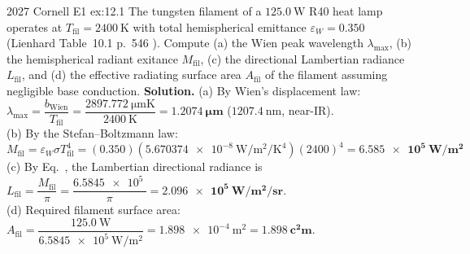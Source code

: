 \begin{workedexample}{2027 Cornell E1 }{ex:12.1}
The tungsten filament of a $\SI{125.0}{\watt}$ R40 heat lamp operates at $T_{\mathrm{fil}} = \SI{2400}{\kelvin}$ with total hemispherical emittance $\varepsilon_W = 0.350$ (Lienhard Table~10.1 p.~546 ). Compute (a) the Wien peak wavelength $\lambda_{\max}$, (b) the hemispherical radiant exitance $M_{\mathrm{fil}}$, (c) the directional Lambertian radiance $L_{\mathrm{fil}}$, and (d) the effective radiating surface area $A_{\mathrm{fil}}$ of the filament assuming negligible base conduction.
\tcblower
\textbf{Solution.} (a) By Wien's displacement law: $\lambda_{\max} = \dfrac{b_{\mathrm{Wien}}}{T_{\mathrm{fil}}} = \dfrac{\SI{2897.772}{\micro\meter\kelvin}}{\SI{2400}{\kelvin}} = \mathbf{\SI{1.2074}{\micro\meter}}$ ($\SI{1207.4}{\nano\meter}$, near-IR).\\
(b) By the Stefan--Boltzmann law:
\[
  M_{\mathrm{fil}} = \varepsilon_W \sigma T_{\mathrm{fil}}^4 = (0.350)(\SI{5.670374e-8}{\watt\per\square\meter\per\kelvin\tothe{4}})(2400)^4 = \mathbf{\SI{6.585e5}{\watt\per\square\meter}}
\]
(c) By Eq.~, the Lambertian directional radiance is $L_{\mathrm{fil}} = \dfrac{M_{\mathrm{fil}}}{\pi} = \dfrac{\SI{6.5845e5}{}}{\pi} = \mathbf{\SI{2.096e5}{\watt\per\square\meter\per\steradian}}$.\\
(d) Required filament surface area: $A_{\mathrm{fil}} = \dfrac{\SI{125.0}{\watt}}{\SI{6.5845e5}{\watt\per\square\meter}} = \SI{1.898e-4}{\square\meter} = \mathbf{\SI{1.898}{\square\centi\meter}}$.
\end{workedexample}

